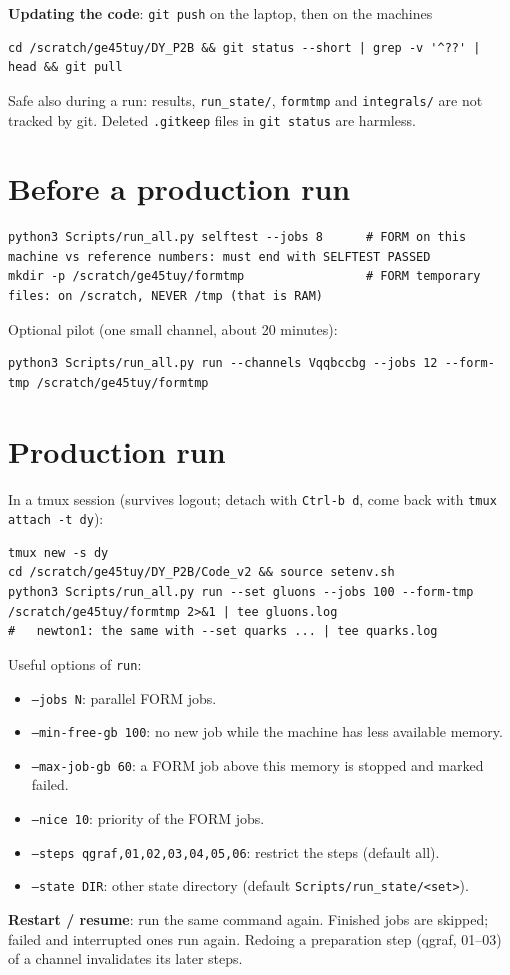 \documentclass[10pt]{article}
\newcommand{\cmd}[1]{\texttt{#1}}
\begin{document}
\textbf{Updating the code}: \cmd{git push} on the laptop, then on the machines
\begin{lstlisting}
cd /scratch/ge45tuy/DY_P2B && git status --short | grep -v '^??' | head && git pull
\end{lstlisting}
Safe also during a run: results, \cmd{run\_state/}, \cmd{formtmp} and \cmd{integrals/} are not tracked by git.
Deleted \cmd{.gitkeep} files in \cmd{git status} are harmless.

\section{Before a production run}
\begin{lstlisting}
python3 Scripts/run_all.py selftest --jobs 8      # FORM on this machine vs reference numbers: must end with SELFTEST PASSED
mkdir -p /scratch/ge45tuy/formtmp                 # FORM temporary files: on /scratch, NEVER /tmp (that is RAM)
\end{lstlisting}
Optional pilot (one small channel, about 20 minutes):
\begin{lstlisting}
python3 Scripts/run_all.py run --channels Vqqbccbg --jobs 12 --form-tmp /scratch/ge45tuy/formtmp
\end{lstlisting}

\section{Production run}
In a tmux session (survives logout; detach with \cmd{Ctrl-b d}, come back with \cmd{tmux attach -t dy}):
\begin{lstlisting}
tmux new -s dy
cd /scratch/ge45tuy/DY_P2B/Code_v2 && source setenv.sh
python3 Scripts/run_all.py run --set gluons --jobs 100 --form-tmp /scratch/ge45tuy/formtmp 2>&1 | tee gluons.log
#   newton1: the same with --set quarks ... | tee quarks.log
\end{lstlisting}
Useful options of \cmd{run}:
\begin{itemize}
\item \cmd{--jobs N}: parallel FORM jobs.
\item \cmd{--min-free-gb 100}: no new job while the machine has less available memory.
\item \cmd{--max-job-gb 60}: a FORM job above this memory is stopped and marked failed.
\item \cmd{--nice 10}: priority of the FORM jobs.
\item \cmd{--steps qgraf,01,02,03,04,05,06}: restrict the steps (default all).
\item \cmd{--state DIR}: other state directory (default \cmd{Scripts/run\_state/<set>}).
\end{itemize}
\textbf{Restart / resume}: run the same command again. Finished jobs are skipped; failed and interrupted ones run
again. Redoing a preparation step (qgraf, 01--03) of a channel invalidates its later steps.
\end{document}
